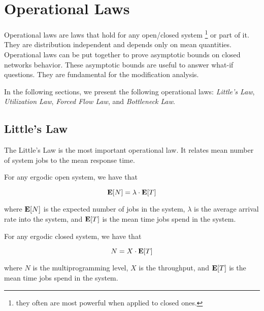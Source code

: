 \section{Operational Laws}
\label{sec:Operational-Laws}

Operational laws are laws that hold for any open/closed system \footnote{they often are most powerful when applied to closed ones.} or part of it.
They are distribution independent and depends only on mean quantities.
Operational laws can be put together to prove asymptotic bounds on closed networks behavior.
These asymptotic bounds are useful to answer what-if questions.
They are fundamental for the modification analysis.

In the following sections, we present the following operational laws: 
\textit{Little's Law},
\textit{Utilization Law},
\textit{Forced Flow Law}, and 
\textit{Bottleneck Law}.




\subsection{Little's Law}
\label{sec:Little-Law}

The Little's Law \cite{little1961proof} is the most important operational law. It relates mean number of system jobs to the mean response time.

\begin{theorem}
\label{thm:Little-Law-Open-Systems}	
	For any ergodic open system, we have that
	
	\begin{equation}
	\label{eqn:Little-Law-Open-Systems}
	\expected{N} = \lambda \cdot \expected{T}
	\end{equation}
	
	where $\mathbf{E}[N]$ is the expected number of jobs in the system, $\lambda$ is the average arrival rate into the system, and $\mathbf{E}[T]$ is the mean time jobs spend in the system.
\end{theorem}

\begin{theorem}
\label{thm:Little-Law-Closed-Systems}	
	For any ergodic closed system, we have that
	
	\begin{equation}
	\label{eqn:Little-Law-Closed-Systems}
	N = X \cdot \expected{T}
	\end{equation}
	
	where $N$ is the multiprogramming level, $X$ is the throughput, and $\mathbf{E}[T]$ is the mean time jobs spend in the system.
\end{theorem}

